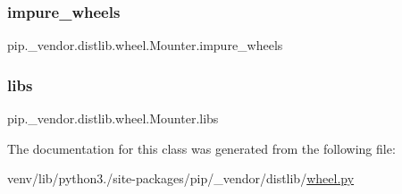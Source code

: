 \subsubsection{\texorpdfstring{impure\+\_\+wheels}{impure\_wheels}}
{\footnotesize\ttfamily pip.\+\_\+vendor.\+distlib.\+wheel.\+Mounter.\+impure\+\_\+wheels}

\mbox{\label{classpip_1_1__vendor_1_1distlib_1_1wheel_1_1Mounter_a90ca414fe31f55f18181337f48d8698d}} 
\subsubsection{\texorpdfstring{libs}{libs}}
{\footnotesize\ttfamily pip.\+\_\+vendor.\+distlib.\+wheel.\+Mounter.\+libs}



The documentation for this class was generated from the following file\+:\begin{DoxyCompactItemize}
\item 
venv/lib/python3./site-\/packages/pip/\+\_\+vendor/distlib/\hyperlink{pip_2__vendor_2distlib_2wheel_8py}{wheel.\+py}\end{DoxyCompactItemize}

